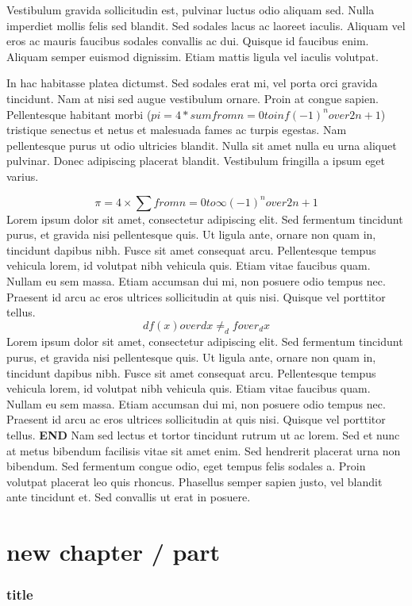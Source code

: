Vestibulum gravida sollicitudin est, pulvinar luctus odio aliquam sed. Nulla imperdiet mollis felis sed blandit. Sed sodales lacus ac laoreet iaculis. Aliquam vel eros ac mauris faucibus sodales convallis ac dui. Quisque id faucibus enim. Aliquam semper euismod dignissim. Etiam mattis ligula vel iaculis volutpat.

In hac habitasse platea dictumst. Sed sodales erat mi, vel porta orci gravida tincidunt. Nam at nisi sed augue vestibulum ornare. Proin at congue sapien. Pellentesque habitant morbi ($pi = 4 * sum from n=0 to inf (-1)^n over 2n+1$) tristique senectus et netus et malesuada fames ac turpis egestas. Nam pellentesque purus ut odio ultricies blandit. Nulla sit amet nulla eu urna aliquet pulvinar. Donec adipiscing placerat blandit. Vestibulum fringilla a ipsum eget varius.

\[
    \pi = 4 \times \sum from n=0 to \infty (-1)^n over 2n+1
\]
Lorem ipsum dolor sit amet, consectetur adipiscing elit. Sed fermentum tincidunt purus, et gravida nisi pellentesque quis. Ut ligula ante, ornare non quam in, tincidunt dapibus nibh. Fusce sit amet consequat arcu. Pellentesque tempus vehicula lorem, id volutpat nibh vehicula quis. Etiam vitae faucibus quam. Nullam eu sem massa. Etiam accumsan dui mi, non posuere odio tempus nec. Praesent id arcu ac eros ultrices sollicitudin at quis nisi. Quisque vel porttitor tellus.
\[
    d f(x) over d x \neq _d f over _d x
\]
Lorem ipsum dolor sit amet, consectetur adipiscing elit. Sed fermentum tincidunt purus, et gravida nisi pellentesque quis. Ut ligula ante, ornare non quam in, tincidunt dapibus nibh. Fusce sit amet consequat arcu. Pellentesque tempus vehicula lorem, id volutpat nibh vehicula quis. Etiam vitae faucibus quam. Nullam eu sem massa. Etiam accumsan dui mi, non posuere odio tempus nec. Praesent id arcu ac eros ultrices sollicitudin at quis nisi. Quisque vel porttitor tellus. \textbf{END}
Nam sed lectus et tortor tincidunt rutrum ut ac lorem. Sed et nunc at metus bibendum facilisis vitae sit amet enim. Sed hendrerit placerat urna non bibendum. Sed fermentum congue odio, eget tempus felis sodales a. Proin volutpat placerat leo quis rhoncus. Phasellus semper sapien justo, vel blandit ante tincidunt et. Sed convallis ut erat in posuere.

\part{new chapter / part}


\section{title}

